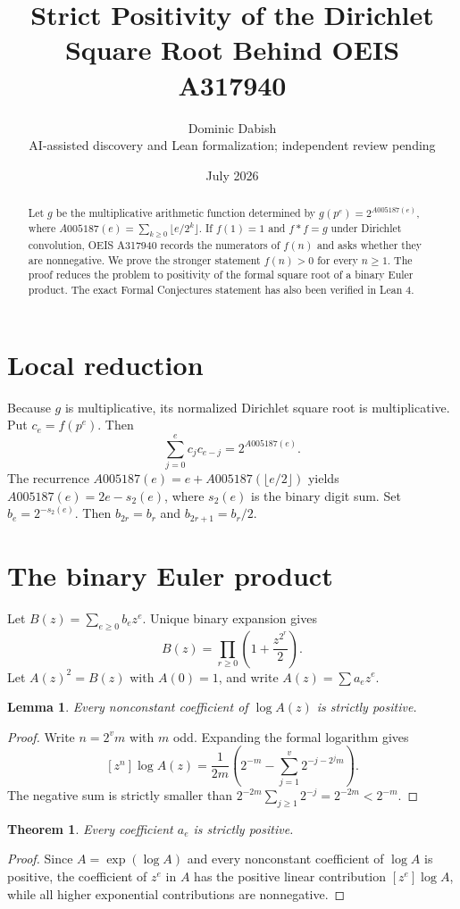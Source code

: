 \documentclass[11pt]{article}
\title{Strict Positivity of the Dirichlet Square Root Behind OEIS A317940}
\author{Dominic Dabish\\\small AI-assisted discovery and Lean formalization; independent review pending}
\date{July 2026}
\newtheorem{theorem}{Theorem}
\newtheorem{lemma}{Lemma}
\begin{document}
\maketitle
\begin{abstract}
Let $g$ be the multiplicative arithmetic function determined by
$g(p^e)=2^{A005187(e)}$, where
$A005187(e)=\sum_{k\ge0}\lfloor e/2^k\rfloor$.
If $f(1)=1$ and $f*f=g$ under Dirichlet convolution, OEIS A317940 records the numerators of $f(n)$ and asks whether they are nonnegative. We prove the stronger statement $f(n)>0$ for every $n\ge1$. The proof reduces the problem to positivity of the formal square root of a binary Euler product. The exact Formal Conjectures statement has also been verified in Lean 4.
\end{abstract}

\section{Local reduction}
Because $g$ is multiplicative, its normalized Dirichlet square root is multiplicative. Put $c_e=f(p^e)$. Then
\begin{equation}\label{local}
\sum_{j=0}^{e}c_jc_{e-j}=2^{A005187(e)}.
\end{equation}
The recurrence $A005187(e)=e+A005187(\lfloor e/2\rfloor)$ yields
$A005187(e)=2e-s_2(e)$, where $s_2(e)$ is the binary digit sum. Set $b_e=2^{-s_2(e)}$. Then
$b_{2r}=b_r$ and $b_{2r+1}=b_r/2$.

\section{The binary Euler product}
Let $B(z)=\sum_{e\ge0}b_ez^e$. Unique binary expansion gives
\[
B(z)=\prod_{r\ge0}\left(1+\frac{z^{2^r}}2\right).
\]
Let $A(z)^2=B(z)$ with $A(0)=1$, and write $A(z)=\sum a_ez^e$.

\begin{lemma}
Every nonconstant coefficient of $\log A(z)$ is strictly positive.
\end{lemma}
\begin{proof}
Write $n=2^vm$ with $m$ odd. Expanding the formal logarithm gives
\[
[z^n]\log A(z)=\frac1{2m}\left(2^{-m}-\sum_{j=1}^{v}2^{-j-2^jm}\right).
\]
The negative sum is strictly smaller than
$2^{-2m}\sum_{j\ge1}2^{-j}=2^{-2m}<2^{-m}$.
\end{proof}

\begin{theorem}
Every coefficient $a_e$ is strictly positive.
\end{theorem}
\begin{proof}
Since $A=\exp(\log A)$ and every nonconstant coefficient of $\log A$ is positive, the coefficient of $z^e$ in $A$ has the positive linear contribution $[z^e]\log A$, while all higher exponential contributions are nonnegative.
\end{proof}
\end{document}
